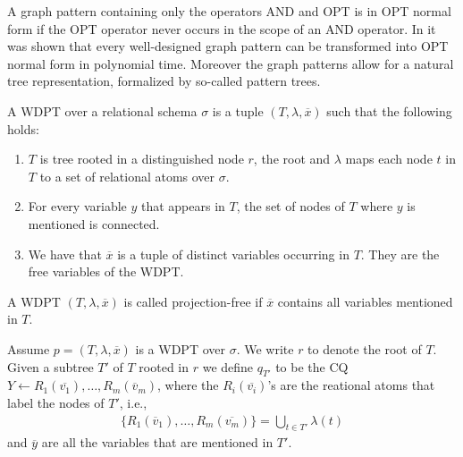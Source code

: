 			\begin{definition}
				A graph pattern containing only the operators AND and OPT is in OPT normal form
				if the OPT operator never occurs in the scope of an AND operator. In
				\cite{letelier2013static} it was shown that every well-designed graph pattern
				can be transformed into OPT normal form in polynomial time. Moreover the graph
				patterns allow for a natural tree representation, formalized by so-called
				pattern trees.
			\end{definition}


			\begin{definition}\label{def:wdpt}
				A WDPT over a relational schema $\sigma$ is a tuple $(T, \lambda, \overline{x})$
				such that the following holds:
				\begin{enumerate}
					\item $T$ is tree rooted in a distinguished node $r$, the root and $\lambda$
						maps each node $t$ in $T$ to a set of relational atoms over $\sigma$.
					\item For every variable $y$ that appears in $T$, the set of nodes of $T$ where
						$y$ is mentioned is connected.
					\item We have that $\overline{x}$ is a tuple of distinct variables occurring in
						$T$. They are the free variables of the WDPT.
				\end{enumerate}
			\end{definition}

			\begin{definition}
				A WDPT $(T,\lambda, \overline{x})$ is called projection-free if $\overline{x}$
				contains all variables mentioned in $T$.
			\end{definition}

			\begin{definition}\label{wdptq}
			Assume $p = (T,\lambda,\overline{x})$ is a WDPT over $\sigma$. We write $r$ to
			denote the root of $T$. Given a subtree $T'$ of $T$ rooted in $r$ we define
			$q_{T'}$ to be the CQ $Y \leftarrow R_1(\overline{v_1}), \dots,
			R_m(\overline{v}_m)$, where the $R_i(\overline{v_i})$'s are the reational atoms
			that label the nodes of $T'$, i.e., 
			\begin{align*}
				\{ R_1(\overline{v}_1), \dots, R_m(\overline{v_m}) \} = \bigcup_{t \in T'} \lambda(t) 
			\end{align*} and $\overline{y}$ are all the variables that are mentioned in
			$T'$. 
			\end{definition}

